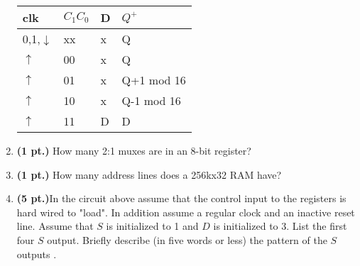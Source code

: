 \documentclass{article}
\begin{document}
\begin{enumerate}
\begin{tabular}{l|l|l||l}
clk		& $C_1 C_0$	& D & $Q^+$	\\ \hline
0,1,$\downarrow$& xx		& x & Q		\\ \hline
$\uparrow$ 	& 00		& x & Q		\\  \hline
$\uparrow$ 	& 01		& x & Q+1 mod 16\\  \hline
$\uparrow$ 	& 10		& x & Q-1 mod 16\\  \hline
$\uparrow$ 	& 11		& D & D		\\
\end{tabular}


\pagebreak
\item {\bf (1 pt.)} How many 2:1 muxes are in an 8-bit register?

\item {\bf (1 pt.)} How many address lines does a 256kx32 RAM have?



\item {\bf (5 pt.)}In the circuit above assume that the 
control input to the registers is hard wired to "load".
In addition assume a regular clock and an inactive reset
line.  Assume that $S$ is initialized to 1 and $D$ is 
initialized to 3.  List the first four $S$ output.  
Briefly describe (in five words or less) the pattern of 
the $S$ outputs .

\end{enumerate}
\end{document}

